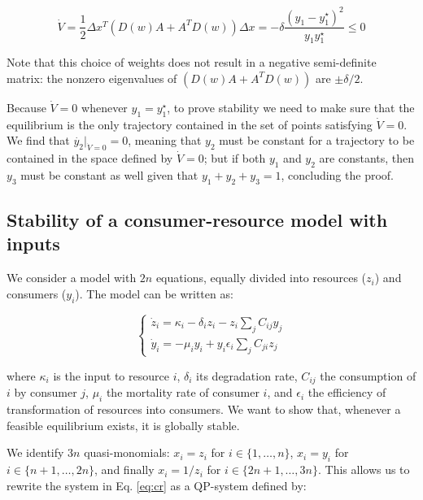\documentclass{article}
\begin{document}
\begin{equation}
\dot{V} = \frac{1}{2} \Delta x^T (D(w) A + A^T D(w)) \Delta x =  - \delta \frac{(y_1 - y_1^\star)^2}{y_1 y_1^\star} \leq 0
\end{equation}

Note that this choice of weights does not result in a negative
semi-definite matrix: the nonzero eigenvalues of \((D(w) A + A^T D(w))\)
are \(\pm \delta / 2\).

Because \(\dot{V} = 0\) whenever \(y_1 = y_1^\star\), to prove stability
we need to make sure that the equilibrium is the only trajectory
contained in the set of points satisfying \(\dot{V} = 0\). We find that
\(\dot{y_2}|_{\dot{V} = 0} = 0\), meaning that \(y_2\) must be constant
for a trajectory to be contained in the space defined by
\(\dot{V} = 0\); but if both \(y_1\) and \(y_2\) are constants, then
\(y_3\) must be constant as well given that \(y_1 + y_2 + y_3 = 1\),
concluding the proof.

\hypertarget{stability-of-a-consumer-resource-model-with-inputs}{%
\subsection{Stability of a consumer-resource model with
inputs}\label{stability-of-a-consumer-resource-model-with-inputs}}

We consider a model with \(2n\) equations, equally divided into
resources (\(z_i\)) and consumers (\(y_i\)). The model can be written
as:

\begin{equation}
\label{eq:cr}
\begin{cases}
\dot{z}_i = \kappa_i - \delta_i z_i - z_i \sum_j C_{ij} y_j\\
\dot{y}_i = - \mu_i y_i + y_i \epsilon_i \sum_j C_{ji} z_j
\end{cases}
\end{equation}

where \(\kappa_i\) is the input to resource \(i\), \(\delta_i\) its
degradation rate, \(C_{ij}\) the consumption of \(i\) by consumer \(j\),
\(\mu_i\) the mortality rate of consumer \(i\), and \(\epsilon_i\) the
efficiency of transformation of resources into consumers. We want to
show that, whenever a feasible equilibrium exists, it is globally
stable.

We identify \(3n\) quasi-monomials: \(x_i = z_i\) for
\(i \in \{1, \ldots, n\}\), \(x_i = y_i\) for
\(i \in \{n + 1, \ldots, 2 n\}\), and finally \(x_i = 1 / z_i\) for
\(i \in \{2 n + 1, \ldots, 3 n\}\). This allows us to rewrite the system
in Eq. \ref{eq:cr} as a QP-system defined by:
\end{document}
